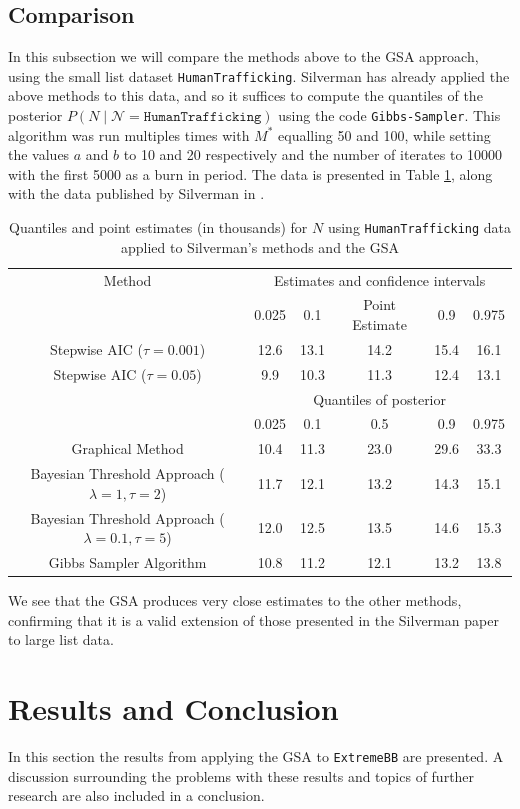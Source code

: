 \documentclass[10pt,a4paper,notitlepage]{article}
\begin{document}
\subsection{Comparison}
In this subsection we will compare the methods above to the GSA approach, using the small list dataset \texttt{HumanTrafficking}. Silverman has already applied the above methods to this data, and so it suffices to compute the quantiles of the posterior $P(N\mid\mathcal{N}=\texttt{HumanTrafficking})$ using the code \texttt{Gibbs-Sampler}. This algorithm was run multiples times with $M^{*}$ equalling 50 and 100, while setting the values $a$ and $b$ to 10 and 20 respectively and the number of iterates to 10000 with the first 5000 as a burn in period. The data is presented in Table \ref{tb:4}, along with the data published by Silverman in \cite{Silverman}.

\begin{table}[H]
\centering
\begin{tabular}{|cccccc|}
\hline Method & \multicolumn{5}{c|}{Estimates and confidence intervals}\\
& 0.025 & 0.1 & Point Estimate & 0.9 & 0.975\\ \cline{2-6}
Stepwise AIC ($\tau =0.001$) & 12.6 &13.1 &14.2 &15.4 &16.1\\
Stepwise AIC ($\tau =0.05$) & 9.9 &10.3 &11.3 &12.4 &13.1\\
\hline \hline  & \multicolumn{5}{c|}{Quantiles of posterior}\\
& 0.025 & 0.1 & 0.5 & 0.9 & 0.975\\ \cline{2-6}
Graphical Method & 10.4 & 11.3 & 23.0 & 29.6 & 33.3\\
Bayesian Threshold Approach ($\lambda= 1, \tau =2$)& 11.7 & 12.1 & 13.2 & 14.3 & 15.1\\
Bayesian Threshold Approach ($\lambda= 0.1, \tau =5$)& 12.0 & 12.5 & 13.5 & 14.6 & 15.3\\
Gibbs Sampler Algorithm & 10.8 & 11.2 & 12.1 & 13.2 & 13.8\\ \hline
\end{tabular}
\caption{Quantiles and point estimates (in thousands) for $N$ using \texttt{HumanTrafficking} data applied to Silverman's methods and the GSA}\label{tb:4}
\end{table}
We see that the GSA produces very close estimates to the other methods, confirming that it is a valid extension of those presented in the Silverman paper to large list data.

\section{Results and Conclusion}\label{sc:6}
In this section the results from applying the GSA to \texttt{ExtremeBB} are presented. A discussion surrounding the problems with these results and topics of further research are also included in a conclusion.
\end{document}
